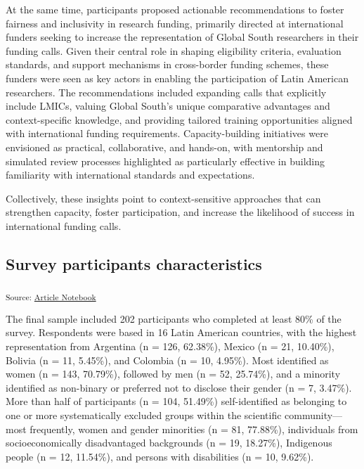 \documentclass[
  letterpaper,
  DIV=11,
  numbers=noendperiod]{scrartcl}
\begin{document}
At the same time, participants proposed actionable recommendations to
foster fairness and inclusivity in research funding, primarily directed
at international funders seeking to increase the representation of
Global South researchers in their funding calls. Given their central
role in shaping eligibility criteria, evaluation standards, and support
mechanisms in cross-border funding schemes, these funders were seen as
key actors in enabling the participation of Latin American researchers.
The recommendations included expanding calls that explicitly include
LMICs, valuing Global South's unique comparative advantages and
context-specific knowledge, and providing tailored training
opportunities aligned with international funding requirements.
Capacity-building initiatives were envisioned as practical,
collaborative, and hands-on, with mentorship and simulated review
processes highlighted as particularly effective in building familiarity
with international standards and expectations.

Collectively, these insights point to context-sensitive approaches that
can strengthen capacity, foster participation, and increase the
likelihood of success in international funding calls.

\subsection{Survey participants
characteristics}\label{survey-participants-characteristics}

\textsubscript{Source:
\href{https://RLadies-BA.github.io/quarto-manuscripts/index.qmd.html}{Article
Notebook}}

The final sample included 202 participants who completed at least 80\%
of the survey. Respondents were based in 16 Latin American countries,
with the highest representation from Argentina (n = 126, 62.38\%),
Mexico (n = 21, 10.40\%), Bolivia (n = 11, 5.45\%), and Colombia (n =
10, 4.95\%). Most identified as women (n = 143, 70.79\%), followed by
men (n = 52, 25.74\%), and a minority identified as non-binary or
preferred not to disclose their gender (n = 7, 3.47\%). More than half
of participants (n = 104, 51.49\%) self-identified as belonging to one
or more systematically excluded groups within the scientific
community---most frequently, women and gender minorities (n = 81,
77.88\%), individuals from socioeconomically disadvantaged backgrounds
(n = 19, 18.27\%), Indigenous people (n = 12, 11.54\%), and persons with
disabilities (n = 10, 9.62\%).
\end{document}
